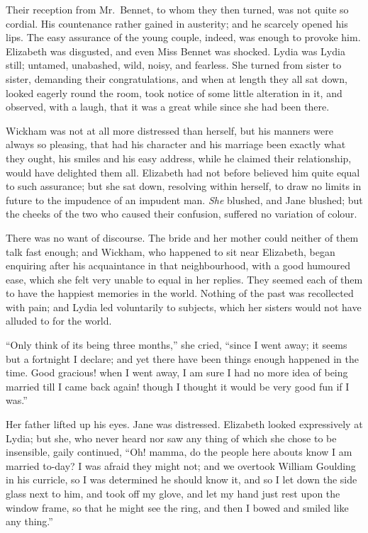 Their reception from Mr.\ Bennet, to whom they then
turned, was not quite so cordial. His countenance rather
gained in austerity; and he scarcely opened his lips.
The easy assurance of the young couple, indeed, was
enough to provoke him. Elizabeth was disgusted, and
even Miss Bennet was shocked. Lydia was Lydia still;
untamed, unabashed, wild, noisy, and fearless. She turned
from sister to sister, demanding their congratulations, and
when at length they all sat down, looked eagerly round
the room, took notice of some little alteration in it, and
observed, with a laugh, that it was a great while since
she had been there.

Wickham was not at all more distressed than herself,
but his manners were always so pleasing, that had his
character and his marriage been exactly what they ought,
his smiles and his easy address, while he claimed their
relationship, would have delighted them all. Elizabeth
had not before believed him quite equal to such assurance;
but she sat down, resolving within herself, to draw no
limits in future to the impudence of an impudent man.
\textit{She} blushed, and Jane blushed; but the cheeks of the
two who caused their confusion, suffered no variation of
colour.

There was no want of discourse. The bride and her
mother could neither of them talk fast enough; and
Wickham, who happened to sit near Elizabeth, began
enquiring after his acquaintance in that neighbourhood,
with a good humoured ease, which she felt very unable
to equal in her replies. They seemed each of them to have
the happiest memories in the world. Nothing of the past
was recollected with pain; and Lydia led voluntarily to
subjects, which her sisters would not have alluded to for
the world.

“Only think of its being three months,” she cried,
“since I went away; it seems but a fortnight I declare;
and yet there have been things enough happened in the
time. Good gracious! when I went away, I am sure
I had no more idea of being married till I came back
again! though I thought it would be very good fun if
I was.”

Her father lifted up his eyes. Jane was distressed.
Elizabeth looked expressively at Lydia; but she, who
never heard nor saw any thing of which she chose to be
insensible, gaily continued, “Oh! mamma, do the people
here abouts know I am married to-day? I was afraid
they might not; and we overtook William Goulding in
his curricle, so I was determined he should know it, and
so I let down the side glass next to him, and took off my
glove, and let my hand just rest upon the window frame,
so that he might see the ring, and then I bowed and
smiled like any thing.”

